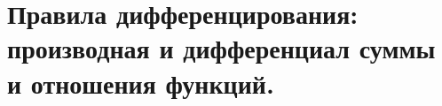 \section{Правила дифференцирования: производная и дифференциал суммы и отношения функций.}

\pagebreak